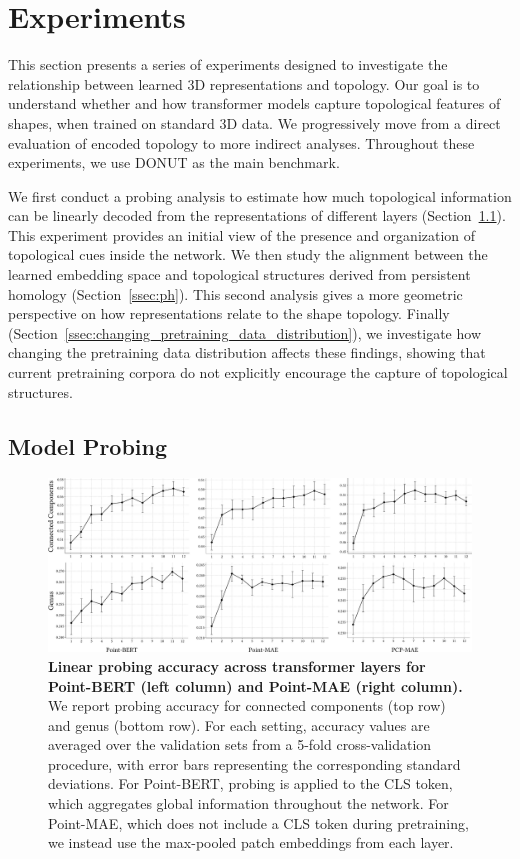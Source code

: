 \section{Experiments}
\label{sec:experiments}

This section presents a series of experiments designed to investigate the relationship between learned 3D representations and topology. Our goal is to understand whether and how transformer models capture topological features of shapes, when trained on standard 3D data. We progressively move from a direct evaluation of encoded topology to more indirect analyses. Throughout these experiments, we use DONUT as the main benchmark.

We first conduct a probing analysis to estimate how much topological information can be linearly decoded from the representations of different layers (Section~\ref{ssec:model_probing}). This experiment provides an initial view of the presence and organization of topological cues inside the network. We then study the alignment between the learned embedding space and topological structures derived from persistent homology (Section~\ref{ssec:ph}). This second analysis gives a more geometric perspective on how representations relate to the shape topology. Finally (Section~\ref{ssec:changing_pretraining_data_distribution}), we investigate how changing the pretraining data distribution affects these findings, showing that current pretraining corpora do not explicitly encourage the capture of topological structures.

\subsection{Model Probing}
\label{ssec:model_probing}

\begin{figure}[h]
  \centering
  \includegraphics[width=\linewidth]{figs/probing.pdf}
  \caption{\textbf{Linear probing accuracy across transformer layers for Point-BERT (left column) and Point-MAE (right column).} We report probing accuracy for connected components (top row) and genus (bottom row). For each setting, accuracy values are averaged over the validation sets from a 5-fold cross-validation procedure, with error bars representing the corresponding standard deviations. For Point-BERT, probing is applied to the CLS token, which aggregates global information throughout the network. For Point-MAE, which does not include a CLS token during pretraining, we instead use the max-pooled patch embeddings from each layer.}
  \label{fig:probing-results}
\end{figure}

